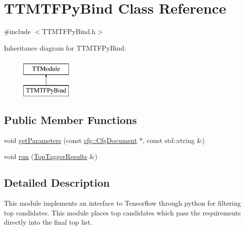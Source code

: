 \hypertarget{classTTMTFPyBind}{\section{T\-T\-M\-T\-F\-Py\-Bind Class Reference}
\label{classTTMTFPyBind}
}


{\ttfamily \#include $<$T\-T\-M\-T\-F\-Py\-Bind.\-h$>$}

Inheritance diagram for T\-T\-M\-T\-F\-Py\-Bind\-:\begin{figure}[H]
\begin{center}
\leavevmode
\includegraphics[height=2.000000cm]{classTTMTFPyBind}
\end{center}
\end{figure}
\subsection*{Public Member Functions}
\begin{DoxyCompactItemize}
\item 
void \hyperlink{classTTMTFPyBind_a3c9f2ca6bc095df3bad89c531cd45544}{get\-Parameters} (const \hyperlink{classcfg_1_1CfgDocument}{cfg\-::\-Cfg\-Document} $\ast$, const std\-::string \&)
\item 
void \hyperlink{classTTMTFPyBind_a5815a77655f5500c117cf71269105242}{run} (\hyperlink{classTopTaggerResults}{Top\-Tagger\-Results} \&)
\end{DoxyCompactItemize}


\subsection{Detailed Description}
This module implements an interface to Tensorflow through python for filtering top candidates. This module places top candidates which pass the requirements directly into the final top list.


